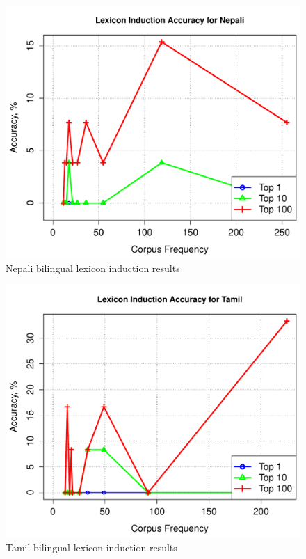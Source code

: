 \documentclass[11pt]{article}
\begin{document}
\begin{figure}[h]
\begin{center}
\includegraphics[width=0.9 \linewidth]{../byFreqGraphs/ne/lexinductnew.pdf}
\vskip -0.15in
\caption{Nepali bilingual lexicon induction results}
\label{fig:bli.ne} 
\end{center}
\end{figure}

\begin{figure}
\begin{center}
\includegraphics[width=0.9 \linewidth]{../byFreqGraphs/ta/lexinductnew.pdf}
\vskip -0.15in
\caption{Tamil bilingual lexicon induction results}
\label{fig:bli.ta} 
\end{center}
\end{figure}
\end{document}
